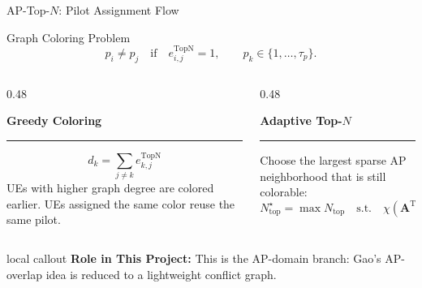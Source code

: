 \documentclass[aspectratio=169, 10pt]{beamer}
\newcommand{\methodTopN}{AP-Top-\(N\)}
\newcommand{\slideheading}[1]{%
    \par\vspace{0.08cm}%
    \settowidth{\dimen0}{\bfseries\large #1}%
    {\bfseries\large #1}%
    \par\vspace{0.015cm}%
    {\color{black}\rule{\dimen0}{0.7pt}}%
    \par\vspace{0.16cm}%
}
\newcommand{\slidecallout}[2]{%
    \vspace{0.08cm}%
    \begin{beamercolorbox}[wd=\linewidth,sep=0.55ex,leftskip=0.8ex,rightskip=0.8ex,rounded=true]{local callout}
        \small{\color{ku_crimson}\bfseries #1:} #2
    \end{beamercolorbox}%
}
\begin{document}
\begin{frame}{\methodTopN{}: Pilot Assignment Flow}
    \small
    \begin{block}{Graph Coloring Problem}
        \[
        p_i\neq p_j
        \quad
        \text{if}
        \quad
        e_{i,j}^{\mathrm{TopN}}=1,
        \qquad
        p_k\in\{1,\ldots,\tau_p\}.
        \]
    \end{block}

    \begin{columns}[T,onlytextwidth]
        \begin{column}{0.48\textwidth}
            \slideheading{Greedy Coloring}
            \[
                d_k=\sum_{j\neq k}e_{k,j}^{\mathrm{TopN}}
            \]
            UEs with higher graph degree are colored earlier. UEs assigned the same color reuse the same pilot.
        \end{column}
        \begin{column}{0.48\textwidth}
            \slideheading{Adaptive Top-\(N\)}
            Choose the largest sparse AP neighborhood that is still colorable:
            \[
                N_{\mathrm{top}}^\star
                =
                \max N_{\mathrm{top}}
                \quad
                \text{s.t.}
                \quad
                \chi(\mathbf{A}^{\mathrm{TopN}})\le \tau_p.
            \]
        \end{column}
    \end{columns}

    \slidecallout{Role in This Project}{This is the AP-domain branch: Gao's AP-overlap idea is reduced to a lightweight conflict graph.}
\end{frame}
\end{document}
